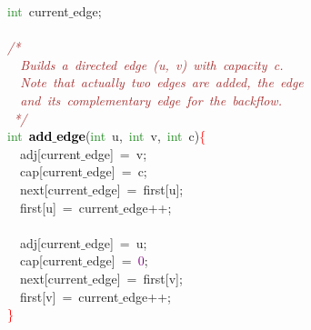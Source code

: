 {{\mbox{}\textcolor{ForestGreen}{int}\ current$\_$edge\textcolor{BrickRed}{;} \\
\mbox{} \\
\mbox{}\textit{\textcolor{Brown}{/*}} \\
\mbox{}\textit{\textcolor{Brown}{\ \ Builds\ a\ directed\ edge\ (u,\ v)\ with\ capacity\ c.}} \\
\mbox{}\textit{\textcolor{Brown}{\ \ Note\ that\ actually\ two\ edges\ are\ added,\ the\ edge}} \\
\mbox{}\textit{\textcolor{Brown}{\ \ and\ its\ complementary\ edge\ for\ the\ backflow.}} \\
\mbox{}\textit{\textcolor{Brown}{\ */}} \\
\mbox{}\textcolor{ForestGreen}{int}\ \textbf{\textcolor{Black}{add$\_$edge}}\textcolor{BrickRed}{(}\textcolor{ForestGreen}{int}\ u\textcolor{BrickRed}{,}\ \textcolor{ForestGreen}{int}\ v\textcolor{BrickRed}{,}\ \textcolor{ForestGreen}{int}\ c\textcolor{BrickRed}{)}\textcolor{Red}{\{} \\
\mbox{}\ \ adj\textcolor{BrickRed}{[}current$\_$edge\textcolor{BrickRed}{]}\ \textcolor{BrickRed}{=}\ v\textcolor{BrickRed}{;} \\
\mbox{}\ \ cap\textcolor{BrickRed}{[}current$\_$edge\textcolor{BrickRed}{]}\ \textcolor{BrickRed}{=}\ c\textcolor{BrickRed}{;} \\
\mbox{}\ \ next\textcolor{BrickRed}{[}current$\_$edge\textcolor{BrickRed}{]}\ \textcolor{BrickRed}{=}\ first\textcolor{BrickRed}{[}u\textcolor{BrickRed}{];} \\
\mbox{}\ \ first\textcolor{BrickRed}{[}u\textcolor{BrickRed}{]}\ \textcolor{BrickRed}{=}\ current$\_$edge\textcolor{BrickRed}{++;} \\
\mbox{} \\
\mbox{}\ \ adj\textcolor{BrickRed}{[}current$\_$edge\textcolor{BrickRed}{]}\ \textcolor{BrickRed}{=}\ u\textcolor{BrickRed}{;} \\
\mbox{}\ \ cap\textcolor{BrickRed}{[}current$\_$edge\textcolor{BrickRed}{]}\ \textcolor{BrickRed}{=}\ \textcolor{Purple}{0}\textcolor{BrickRed}{;} \\
\mbox{}\ \ next\textcolor{BrickRed}{[}current$\_$edge\textcolor{BrickRed}{]}\ \textcolor{BrickRed}{=}\ first\textcolor{BrickRed}{[}v\textcolor{BrickRed}{];} \\
\mbox{}\ \ first\textcolor{BrickRed}{[}v\textcolor{BrickRed}{]}\ \textcolor{BrickRed}{=}\ current$\_$edge\textcolor{BrickRed}{++;} \\
\mbox{}\textcolor{Red}{\}} \\
}}
